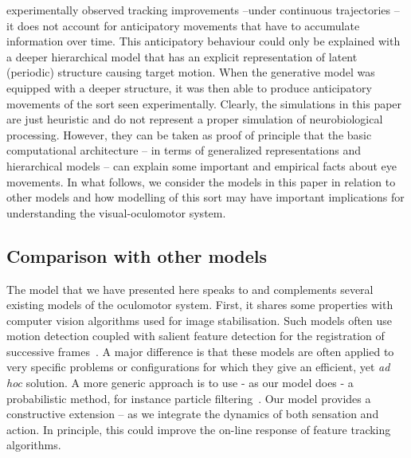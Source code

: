 \documentclass[a4paper]{article} %
\begin{document}
experimentally observed tracking improvements --under continuous
trajectories -- it does not account for anticipatory movements that have
to accumulate information over time. This anticipatory behaviour could
only be explained with a deeper hierarchical model that has an explicit
representation of latent (periodic) structure causing target motion.
When the generative model was equipped with a deeper structure, it was
then able to produce anticipatory movements of the sort seen
experimentally. Clearly, the simulations in this paper are just
heuristic and do not represent a proper simulation of neurobiological
processing. However, they can be taken as proof of principle that the
basic computational architecture -- in terms of generalized
representations and hierarchical models -- can explain some important
and empirical facts about eye movements. In what follows, we consider
the models in this paper in relation to other models and how modelling
of this sort may have important implications for understanding the
visual-oculomotor system.

\subsection{Comparison with other models}

The model that we have presented here speaks to and complements several
existing models of the oculomotor system. First, it shares some
properties with computer vision algorithms used for image stabilisation.
Such models often use motion detection coupled with salient feature
detection for the registration of successive frames~\citep{Lucas81}. A major difference is that these models are often applied to very
specific problems or configurations for which they give an efficient,
yet \emph{ad hoc} solution. A more generic approach is to use - as our
model does - a probabilistic method, for instance particle filtering~\citep{Isard98}. Our model provides a constructive extension --
as we integrate the dynamics of both sensation and action. In principle,
this could improve the on-line response of feature tracking algorithms.
\end{document}
